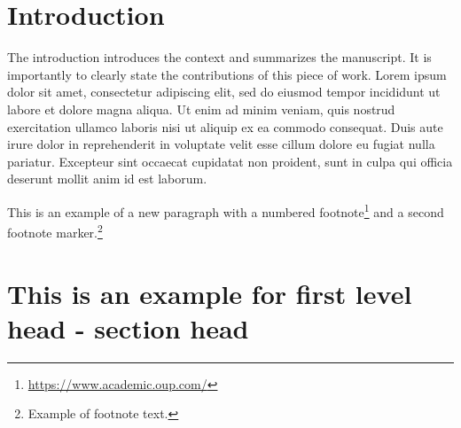 \documentclass[unnumsec,webpdf,modern,large]{oup-authoring-template}
\theoremstyle{thmstyleone}%
\theoremstyle{thmstyletwo}%
\theoremstyle{thmstylethree}%
\begin{document}



\maketitle


\section{Introduction}
The introduction introduces the context and summarizes the manuscript. It is importantly to clearly state the contributions
of this piece of work. Lorem ipsum dolor sit amet, consectetur adipiscing elit, sed do eiusmod tempor incididunt ut labore et dolore magna aliqua. Ut enim ad minim veniam, quis nostrud exercitation ullamco laboris nisi ut aliquip ex ea commodo consequat. Duis aute irure dolor in reprehenderit in voluptate velit esse cillum dolore eu fugiat nulla pariatur. Excepteur sint occaecat cupidatat non proident, sunt in culpa qui officia deserunt mollit anim id est laborum.

This is an example of a new paragraph with a numbered footnote\footnote{\url{https://www.academic.oup.com/}} and a second footnote marker.\footnote{Example of footnote text.}



\section{This is an example for first level head - section head}\label{sec2}
\end{document}
